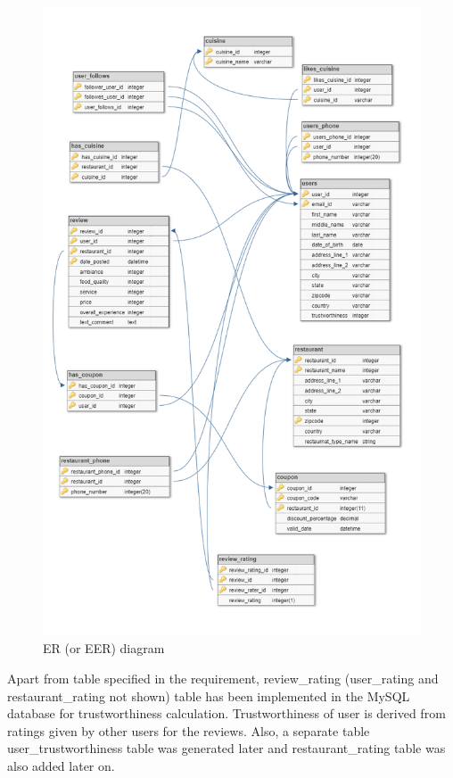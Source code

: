 \documentclass[12pt]{report}
\begin{document}
\begin{figure}[H]
\begin{center}
\caption{ER (or EER) diagram}
\includegraphics[scale=0.65]{rt}
\end{center}
\end{figure}
Apart from table specified in the requirement, review\_rating (user\_rating and restaurant\_rating not shown) table has been implemented in the MySQL database for trustworthiness calculation. Trustworthiness of user is derived from ratings given by other users for the reviews. Also, a separate table user\_trustworthiness table was generated later and restaurant\_rating table was also added later on.
\end{document}
